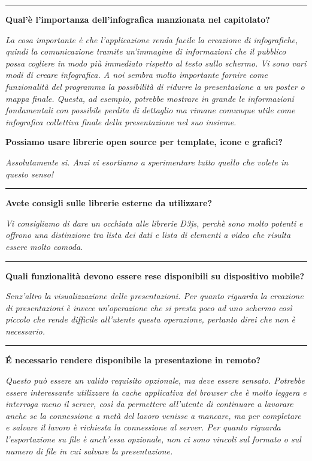 \hrule
\bigskip
\textbf{Qual'è l'importanza dell'infografica manzionata nel capitolato?}\\
\begin{margini}{0.7cm}{0.7cm}
	\textit{La cosa importante è che l'applicazione renda facile la creazione di infografiche, quindi la comunicazione tramite un'immagine di informazioni che il pubblico possa cogliere in modo più immediato rispetto al testo sullo schermo. Vi sono vari modi di creare infografica. A noi sembra molto importante fornire come funzionalità del programma la possibilità di ridurre la  presentazione a un poster o mappa finale. Questa, ad esempio, potrebbe mostrare in grande le informazioni fondamentali con possibile perdita di dettaglio ma rimane comunque utile come infografica collettiva finale della presentazione nel suo insieme.}\\
\end{margini}
\newpage
\noindent \textbf{Possiamo usare librerie open source per template, icone e grafici?}\\
\begin{margini}{0.7cm}{0.7cm}
	\textit{Assolutamente si. Anzi vi esortiamo a sperimentare tutto quello che volete in questo senso!}\\
\end{margini}
\hrule
\bigskip
\textbf{Avete consigli sulle librerie esterne da utilizzare?}\\
\begin{margini}{0.7cm}{0.7cm}
	\textit{Vi consigliamo di dare un occhiata alle librerie D3js, perchè sono molto potenti e offrono una distinzione tra lista dei dati e lista di elementi a video che risulta essere molto comoda.}\\
\end{margini}
\hrule
\bigskip
\textbf{Quali funzionalità devono essere rese disponibili su dispositivo mobile?}\\
\begin{margini}{0.7cm}{0.7cm}
	\textit{Senz'altro la visualizzazione delle presentazioni. Per quanto riguarda la creazione di presentazioni è invece un'operazione che si presta poco ad uno schermo così piccolo che rende difficile all'utente questa operazione, pertanto direi che non è necessario.}\\
\end{margini}
\hrule
\bigskip
\textbf{É necessario rendere disponibile la presentazione in remoto?}\\
\begin{margini}{0.7cm}{0.7cm}
	\textit{Questo può essere un valido requisito opzionale, ma deve essere sensato. Potrebbe essere interessante utilizzare la cache applicativa del browser che è molto leggera e interroga meno il server, così da permettere all'utente di continuare a lavorare anche se la connessione a metà del lavoro venisse a mancare, ma per completare e salvare il lavoro è richiesta la connessione al server. Per quanto riguarda l'esportazione su file è anch'essa opzionale, non ci sono vincoli sul formato o sul numero di file in cui salvare la presentazione.}\\
\end{margini}
